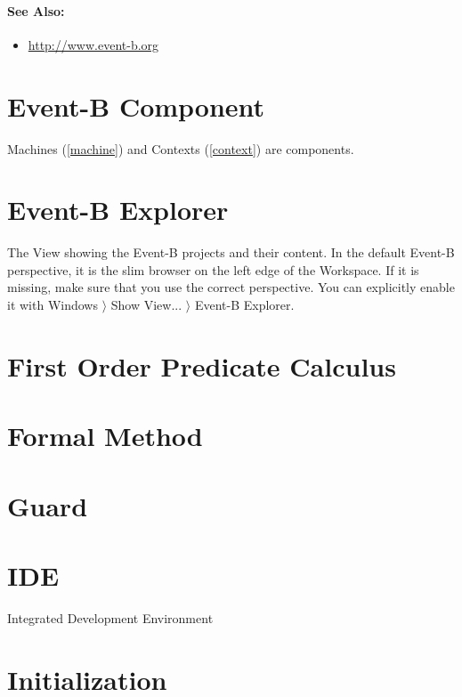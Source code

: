 \paragraph{See Also:}
\begin{itemize}
\item \url{http://www.event-b.org}
\end{itemize}

\section{Event-B Component}
\label{eventb_component}

Machines (\ref{machine}) and Contexts (\ref{context}) are components.

\section{Event-B Explorer}
\label{eventb_explorer}

The View showing the Event-B projects and their content.  In the default Event-B perspective, it is the slim browser on the left edge of the Workspace.  If it is missing, make sure that you use the correct perspective.  You can explicitly enable it with \textsf{Windows $\rangle$ Show View... $\rangle$ Event-B Explorer}.

\section{First Order Predicate Calculus}
\label{first_order_predicate_calculus}


\section{Formal Method}
\label{formal_method}

\section{Guard}
\label{guard}

\section{IDE}
\label{ide}

Integrated Development Environment

\section{Initialization}
\label{initialization}

